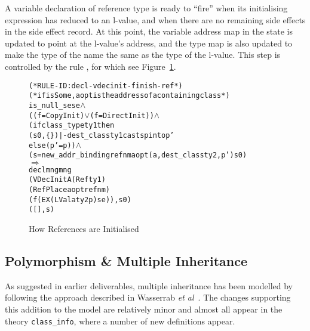 \documentclass[11pt]{article}
\newcommand{\lbr}{\texttt{\{}}
\newcommand{\rbr}{\texttt{\}}}
\begin{document}
A variable declaration of reference type is ready to ``fire'' when its
initialising expression has reduced to an l-value, and when there are
no remaining side effects in the side effect record.  At this point,
the variable address map in the state is updated to point at the
l-value's address, and the type map is also updated to make the type
of the name the same as the type of the l-value.
This step is controlled by the rule ,
for which see Figure~\ref{fig:decl-vdecinit-finish-ref}.
\begin{figure}[hbtp]
\begin{center}
  \begin{minipage}{\textwidth}
%
\begin{alltt}
(* RULE-ID: decl-vdecinit-finish-ref *)
(* if isSome, aopt is the address of a containing class *)
     is_null_se se \(\land\)
     ((f = CopyInit) \(\lor\) (f = DirectInit)) \(\land\)
     (if class_type ty1 then
        (s0,\lbr\rbr) |- dest_class ty1 casts p into p'
      else (p' = p)) \(\land\)
     (s = new_addr_binding refnm aopt (a,dest_class ty2,p') s0)
   \(\Rightarrow\)
     declmng mng
             (VDecInitA (Ref ty1)
                        (RefPlace aopt refnm)
                        (f (EX (LVal a ty2 p) se)), s0)
             ([], s)
\end{alltt}
  \end{minipage}
\end{center}
\caption{How References are Initialised}
\label{fig:decl-vdecinit-finish-ref}
\end{figure}




\subsection{Polymorphism \& Multiple Inheritance}
\label{sec:multiple-inheritance}

As suggested in earlier deliverables, multiple inheritance has been
modelled by following the approach described in Wasserrab \emph{et
  al}~\cite{wasserrab-nst-OOPSLA06}.  The changes supporting this
addition to the model are relatively minor and almost all appear in
the theory \texttt{class_info}, where a number of new definitions
appear.

\newcommand{\Cs}{\mathit{Cs}} \newcommand{\fld}{\mathit{fld}}
\end{document}
